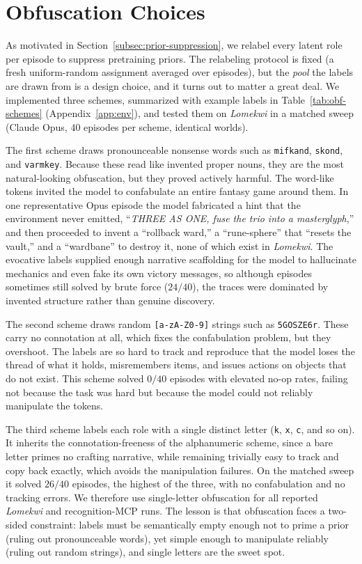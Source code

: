 \documentclass{article}
\begin{document}
\section{Obfuscation Choices}
\label{app:obfuscation}

As motivated in Section~\ref{subsec:prior-suppression}, we relabel every latent role per episode to suppress pretraining priors. The relabeling protocol is fixed (a fresh uniform-random assignment averaged over episodes), but the \emph{pool} the labels are drawn from is a design choice, and it turns out to matter a great deal. We implemented three schemes, summarized with example labels in Table~\ref{tab:obf-schemes} (Appendix~\ref{app:env}), and tested them on \emph{Lomekwi} in a matched sweep (Claude Opus, 40 episodes per scheme, identical worlds).

The first scheme draws pronounceable nonsense words such as \texttt{mifkand}, \texttt{skond}, and \texttt{varmkey}. Because these read like invented proper nouns, they are the most natural-looking obfuscation, but they proved actively harmful. The word-like tokens invited the model to confabulate an entire fantasy game around them. In one representative Opus episode the model fabricated a hint that the environment never emitted, ``\emph{THREE AS ONE, fuse the trio into a masterglyph},'' and then proceeded to invent a ``rollback ward,'' a ``rune-sphere'' that ``resets the vault,'' and a ``wardbane'' to destroy it, none of which exist in \emph{Lomekwi}. The evocative labels supplied enough narrative scaffolding for the model to hallucinate mechanics and even fake its own victory messages, so although episodes sometimes still solved by brute force ($24/40$), the traces were dominated by invented structure rather than genuine discovery.

The second scheme draws random \texttt{[a-zA-Z0-9]} strings such as \texttt{5GOSZE6r}. These carry no connotation at all, which fixes the confabulation problem, but they overshoot. The labels are so hard to track and reproduce that the model loses the thread of what it holds, misremembers items, and issues actions on objects that do not exist. This scheme solved $0/40$ episodes with elevated no-op rates, failing not because the task was hard but because the model could not reliably manipulate the tokens.

The third scheme labels each role with a single distinct letter (\texttt{k}, \texttt{x}, \texttt{c}, and so on). It inherits the connotation-freeness of the alphanumeric scheme, since a bare letter primes no crafting narrative, while remaining trivially easy to track and copy back exactly, which avoids the manipulation failures. On the matched sweep it solved $26/40$ episodes, the highest of the three, with no confabulation and no tracking errors. We therefore use single-letter obfuscation for all reported \emph{Lomekwi} and recognition-MCP runs. The lesson is that obfuscation faces a two-sided constraint: labels must be semantically empty enough not to prime a prior (ruling out pronounceable words), yet simple enough to manipulate reliably (ruling out random strings), and single letters are the sweet spot.
\end{document}
